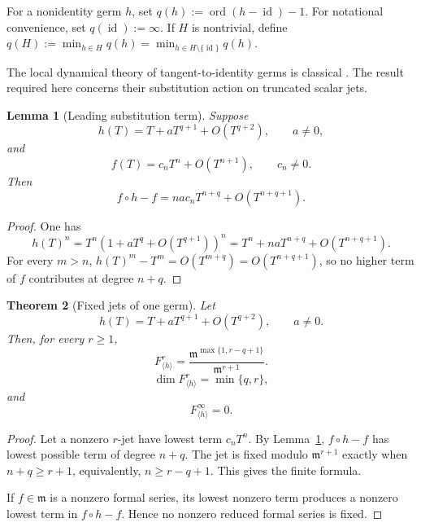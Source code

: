 \documentclass[11pt]{article}
\theoremstyle{plain}
\newtheorem{theorem}{Theorem}[section]
\newtheorem{lemma}[theorem]{Lemma}
\theoremstyle{definition}
\begin{document}
For a nonidentity germ \(h\), set
\(q(h) := \operatorname{ord} \left( h-\operatorname{id} \right)-1\).
For notational convenience, set
\(q(\operatorname{id}):=\infty\).
If \(H\) is nontrivial, define
\(q(H) := \min_{h\in H}q(h) = \min_{h\in H\setminus\{\operatorname{id}\}}q(h)\).

The local dynamical theory of tangent-to-identity germs is classical
\citep{Ecalle1975,IlyashenkoYakovenko2008,Abate2010,EynardBontempsNavas2024}.
The result required here concerns their substitution action on
truncated scalar jets.

\begin{lemma}[Leading substitution term]
\label{lem:leading-substitution-term}
Suppose
\[
  h(T)
  =
  T+aT^{q+1}
  +
  O(T^{q+2}),
  \qquad
  a\neq0,
\]
and
\[
  f(T)
  =
  c_nT^n
  +
  O(T^{n+1}),
  \qquad
  c_n\neq0.
\]
Then
\[
  \boxed{
  f\circ h-f
  =
  nac_nT^{n+q}
  +
  O(T^{n+q+1}).
  }
\]
\end{lemma}

\begin{proof}
One has
\[
  h(T)^n
  =
  T^n
  \left(
    1+aT^q+O(T^{q+1})
  \right)^n
  =
  T^n
  +
  naT^{n+q}
  +
  O(T^{n+q+1}).
\]
For every \(m>n\),
\(h(T)^m-T^m = O(T^{m+q}) = O(T^{n+q+1})\),
so no higher term of \(f\) contributes at degree \(n+q\).
\end{proof}

\begin{theorem}[Fixed jets of one germ]
\label{thm:fixed-jets-single-germ}
Let
\[
  h(T)
  =
  T+aT^{q+1}
  +
  O(T^{q+2}),
  \qquad
  a\neq0.
\]
Then, for every \(r\geq1\),
\[
  \boxed{
  F_{\langle h\rangle}^r
  =
  \frac{
    \mathfrak m^{\max\{1,r-q+1\}}
  }{
    \mathfrak m^{r+1}
  }.
  }
\]
\[
  \dim F_{\langle h\rangle}^r
  =
  \min\{q,r\},
\]
and
\[
  F_{\langle h\rangle}^\infty=0.
\]
\end{theorem}

\begin{proof}
Let a nonzero \(r\)-jet have lowest term \(c_nT^n\). By
Lemma~\ref{lem:leading-substitution-term}, \(f\circ h-f\) has lowest possible term of degree \(n+q\). The jet is fixed modulo
\(\mathfrak m^{r+1}\) exactly when
\(n+q\geq r+1\),
equivalently,
\(n\geq r-q+1\).
This gives the finite formula.

If \(f\in\mathfrak m\) is a nonzero formal series, its lowest nonzero
term produces a nonzero lowest term in \(f\circ h-f\). Hence no
nonzero reduced formal series is fixed.
\end{proof}
\end{document}
